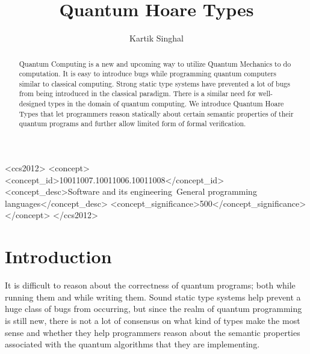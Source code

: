 \documentclass[acmsmall,nonacm]{acmart}\settopmatter{printfolios=true,printccs=false,printacmref=false}
\begin{document}
\title[Quantum Hoare Types]{Quantum Hoare Types}         %



\author{Kartik Singhal}



\begin{abstract}
	Quantum Computing is a new and upcoming way to utilize Quantum Mechanics to do computation. It is easy to introduce bugs while programming quantum computers similar to classical computing. Strong static type systems have prevented a lot of bugs from being introduced in the classical paradigm. There is a similar need for well-designed types in the domain of quantum computing. We introduce Quantum Hoare Types that let programmers reason statically about certain semantic properties of their quantum programs and further allow limited form of formal verification.

\end{abstract}


\begin{CCSXML}
<ccs2012>
<concept>
<concept_id>10011007.10011006.10011008</concept_id>
<concept_desc>Software and its engineering~General programming languages</concept_desc>
<concept_significance>500</concept_significance>
</concept>
</ccs2012>
\end{CCSXML}





\maketitle


\section{Introduction}
%
%


It is difficult to reason about the correctness of quantum programs; both while running them and while writing them. Sound static type systems help prevent a huge class of bugs from occurring, but since the realm of quantum programming is still new, there is not a lot of consensus on what kind of types make the most sense and whether they help programmers reason about the semantic properties associated with the quantum algorithms that they are implementing.
\end{document}
